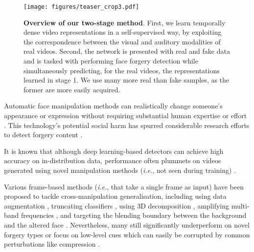\documentclass[10pt,twocolumn,letterpaper]{article}
\begin{document}
\begin{figure}[t]
\begin{center}
  \texttt{[image: figures/teaser\_crop3.pdf]}
\end{center}
  \caption{\textbf{Overview of our two-stage method}. First, we learn temporally dense video representations in a self-supervised way, by exploiting the correspondence between the visual and auditory modalities of real videos. Second, the network is presented with real and fake data and is tasked with performing face forgery detection while simultaneously predicting, for the real videos, the representations learned in stage 1. We use many more real than fake samples, as the former are more easily acquired.}
\label{fig:teaser}
\end{figure}

Automatic face manipulation methods can realistically change someone's appearance or expression without requiring substantial human expertise or effort \cite{rossler2019faceforensics++, jiang2020deeperforensics, li2020advancing, li2020celeb, dolhansky2020deepfake}. This technology's potential social harm has spurred considerable research efforts to detect forgery content \cite{li2020face, haliassos2021lips, afchar2018mesonet, guera2018deepfake, zhou2017two, dang2020detection, mittal2020emotions, zhu2021face, zhao2021multi, chen2021magdr, fung2021deepfakeucl, qian2020thinking, gu2021spatiotemporal, khan2021video}. 

It is known that although deep learning-based detectors can achieve high accuracy on in-distribution data, performance often plummets on videos generated using novel manipulation methods (\textit{i.e.}, not seen during training) \cite{haliassos2021lips, li2020face, chai2020makes, li2020celeb, zhu2021face, wang2020cnn, cozzolino2018forensictransfer}. 

Various frame-based methods (\textit{i.e.}, that take a single frame as input) have been proposed to tackle cross-manipulation generalisation, including using data augmentation \cite{wang2020cnn}, truncating classifiers \cite{chai2020makes}, using 3D decomposition \cite{zhu2021face}, amplifying multi-band frequencies \cite{masi2020two}, and targeting the blending boundary between the background and the altered face \cite{li2020face}. Nevertheless, many still significantly underperform on novel forgery types or focus on low-level cues which can easily be corrupted by common perturbations like compression \cite{haliassos2021lips}.
\end{document}
